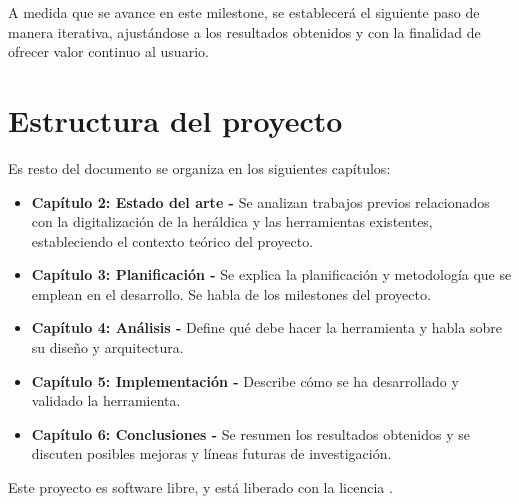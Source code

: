 A medida que se avance en este milestone, se establecerá el siguiente paso de manera iterativa,
ajustándose a los resultados obtenidos y con la finalidad de ofrecer valor continuo al usuario.

\section{Estructura del proyecto}
Es resto del documento se organiza en los siguientes capítulos:

\begin{itemize}
    \item \textbf{Capítulo 2: Estado del arte - }Se analizan trabajos previos relacionados
    con la digitalización de la heráldica y las herramientas existentes, estableciendo
    el contexto teórico del proyecto.
    \item \textbf{Capítulo 3: Planificación - }Se explica la planificación y metodología
    que se emplean en el desarrollo. Se habla de los milestones del proyecto.
    \item \textbf{Capítulo 4: Análisis - }Define qué debe hacer la herramienta y habla
    sobre su diseño y arquitectura.
    \item \textbf{Capítulo 5: Implementación - }Describe cómo se ha desarrollado y validado
    la herramienta. 
    \item \textbf{Capítulo 6: Conclusiones - }Se resumen los resultados obtenidos y se
    discuten posibles mejoras y líneas futuras de investigación.
\end{itemize}

Este proyecto es software libre, y está liberado con la licencia \cite{gplv3}.